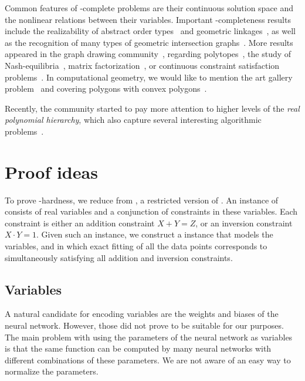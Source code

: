 \documentclass{toc}
\begin{document}
Common features of \ER-complete problems are their continuous solution space and the nonlinear relations between their variables.
Important \ER-completeness results include the realizability of abstract order types~\cite{Mnev1988_UniversalityTheorem, Shor1991_Stretchability} and geometric linkages~\cite{Schaefer2013_Realizability}, as well as the recognition of many types of geometric intersection graphs~\cite{Cardinal2018_Intersection,Kang2012_Sphere,Kratochvil1994_IntersectionGraphs, Matousek2014_IntersectionGraphsER,McDiarmid2013_DiskSegmentGraphs}.
More results appeared in the graph drawing community~\cite{Dobbins2023_AreaUniversality, Jungeblut2024_Lombardi, Lubiw2022_DrawingInPolygonialRegion, Schaefer2021_FixedK, Schaefer2023_RAC}, regarding polytopes~\cite{Richter1995_Polytopes}, the study of Nash-equilibria~\cite{Berthelsen2022_MultiPlayerNash, Bilo2021_Nash, Garg2018_MultiPlayer, Schaefer2017_FixedPointsNash}, matrix factorization~\cite{Chistikov2016_Matrix, Schaefer2018_TensorRank, Shitov2017_PSMatrixFactorization}, or continuous constraint satisfaction problems~\cite{Miltzow2022_ContinuousCSP}.
In computational geometry, we would like to mention the art gallery problem~\cite{Abrahamsen2022_ArtGallery, Stade2023_ArtGallery} and covering polygons with convex polygons~\cite{Abrahamsen2022_Covering}.

Recently, the community started to pay more attention to higher levels of the \emph{real polynomial hierarchy}, which also capture several interesting algorithmic problems~\cite{Blanc2021_ESS, Burgisser2009_ExoticQuantifiers, DCosta2021_EscapeProblem, Dobbins2023_AreaUniversality, Jungeblut2024_Hausdorff, Schaefer2023_RealHierarchy}.

\section{Proof ideas}
\label{sec:key_ideas}

To prove \ER-hardness, we reduce from \ETRINV, a restricted version of \ETR.
An instance of \ETRINV consists of real variables and a conjunction of constraints in these variables.
Each constraint is either an addition constraint $X + Y = Z$, or an inversion constraint $X \cdot Y = 1$.
Given such an instance, we construct a \trainNN instance that models the variables, and in which exact fitting of all the data points corresponds to simultaneously satisfying all addition and inversion constraints.

\subsection{Variables}   %
A natural candidate for encoding variables are the weights and biases of the neural network.
However, those did not prove to be suitable for our purposes.
The main problem with using the parameters of the neural network as variables is that the same function can be computed by many neural networks with different combinations of these parameters.
We are not aware of an easy way to normalize the parameters.
\end{document}
